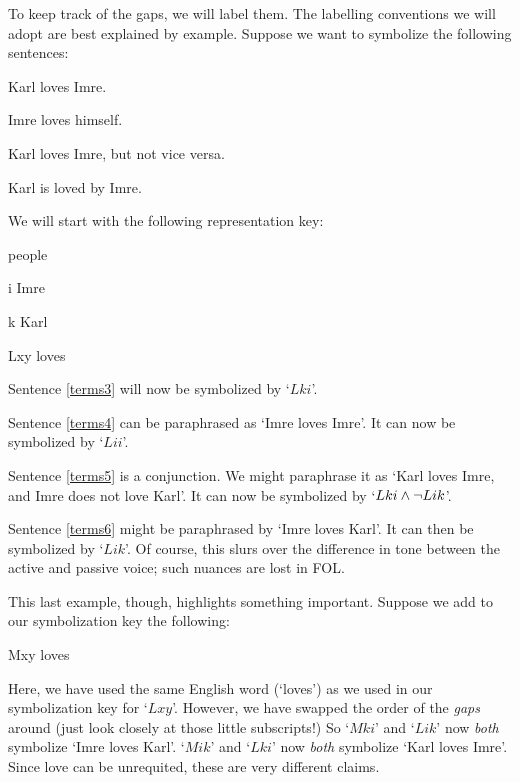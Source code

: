 To keep track of the gaps, we will label them. The labelling conventions we will adopt are best explained by example. Suppose we want to symbolize the following sentences:
	\begin{earg}
		\item[\ex{terms3}] Karl loves Imre.
		\item[\ex{terms4}] Imre loves himself.
		\item[\ex{terms5}] Karl loves Imre, but not vice versa.
		\item[\ex{terms6}] Karl is loved by Imre.
	\end{earg}
We will start with the following representation key:
	\begin{ekey}
		\item[\text{domain}] people
		\item[i] Imre
		\item[k] Karl
		\item[Lxy]  loves 
	\end{ekey}
Sentence \ref{terms3} will now be symbolized by `$Lki$'. 

Sentence \ref{terms4} can be paraphrased as `Imre loves Imre'. It can now be symbolized by `$Lii$'. 

Sentence \ref{terms5} is a conjunction. We might paraphrase it as `Karl loves Imre, and Imre does not love Karl'. It can now be symbolized by `$Lki \wedge \neg Lik$'. 

Sentence \ref{terms6} might be paraphrased by `Imre loves Karl'. It can then be symbolized by `$Lik$'. Of course, this slurs over the difference in tone between the active and passive voice; such nuances are lost in FOL. 

This last example, though, highlights something important. Suppose we add to our symbolization key the following:
	\begin{ekey}
		\item[Mxy]  loves \gap{x}
	\end{ekey}
Here, we have used the same English word (`loves') as we used in our symbolization key for `$Lxy$'. However, we have swapped the order of the \emph{gaps} around (just look closely at those little subscripts!) So `$Mki$' and `$Lik$' now \emph{both} symbolize `Imre loves Karl'. `$Mik$' and `$Lki$' now \emph{both} symbolize `Karl loves Imre'. Since love can be unrequited, these are very different claims. 

